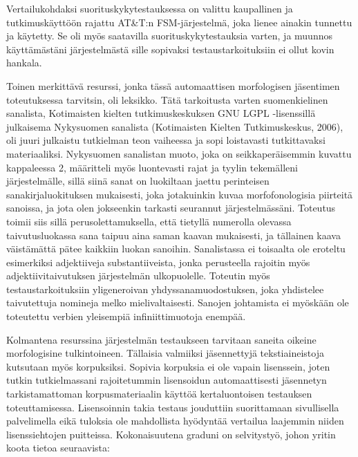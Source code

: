 \documentclass[free]{flammie}
\begin{document}
Vertailukohdaksi suorituskykytestauksessa on valittu kaupallinen ja
tutkimuskäyttöön rajattu AT\&T:n FSM-järjestelmä, joka lienee ainakin tunnettu
ja käytetty. Se oli myös saatavilla suorituskykytestauksia varten, ja muunnos
käyttämästäni järjestelmästä sille sopivaksi testaustarkoituksiin ei ollut kovin
hankala.

Toinen merkittävä resurssi, jonka tässä automaattisen morfologisen jäsentimen
toteutuksessa tarvitsin, oli leksikko. Tätä tarkoitusta varten suomenkielinen
sanalista, Kotimaisten kielten tutkimuskeskuksen GNU LGPL -lisenssillä
julkaisema Nykysuomen sanalista (Kotimaisten Kielten Tutkimuskeskus, 2006), oli
juuri julkaistu tutkielman teon vaiheessa ja sopi loistavasti tutkittavaksi
materiaaliksi.  Nykysuomen sanalistan muoto, joka on seikkaperäisemmin kuvattu
kappaleessa 2, määritteli myös luontevasti rajat ja tyylin tekemälleni
järjestelmälle, sillä siinä sanat on luokiltaan jaettu perinteisen
sanakirjaluokituksen mukaisesti, joka jotakuinkin kuvaa morfofonologisia
piirteitä sanoissa, ja jota olen jokseenkin tarkasti seurannut järjestelmässäni.
Toteutus toimii siis sillä perusolettamuksella, että tietyllä numerolla olevassa
taivutusluokassa sana taipuu aina saman kaavan mukaisesti, ja tällainen kaava
väistämättä pätee kaikkiin luokan sanoihin. Sanalistassa ei toisaalta ole
eroteltu esimerkiksi adjektiiveja substantiiveista, jonka perusteella rajoitin
myös adjektiivitaivutuksen järjestelmän ulkopuolelle. Toteutin myös
testaustarkoituksiin yligeneroivan yhdyssanamuodostuksen, joka yhdistelee
taivutettuja nomineja melko mielivaltaisesti. Sanojen johtamista ei myöskään ole
toteutettu verbien yleisempiä infiniittimuotoja enempää.

Kolmantena resurssina järjestelmän testaukseen tarvitaan saneita oikeine
morfologisine tulkintoineen. Tällaisia valmiiksi jäsennettyjä tekstiaineistoja
kutsutaan myös korpuksiksi. Sopivia korpuksia ei ole vapain lisenssein, joten
tutkin tutkielmassani rajoitetummin lisensoidun automaattisesti jäsennetyn
tarkistamattoman korpusmateriaalin käyttöä kertaluontoisen testauksen
toteuttamisessa. Lisensoinnin takia testaus jouduttiin suorittamaan sivullisella
palvelimella eikä tuloksia ole mahdollista hyödyntää vertailua laajemmin niiden
lisenssiehtojen puitteissa.  Kokonaisuutena graduni on selvitystyö, johon yritin
koota tietoa seuraavista:
\end{document}
